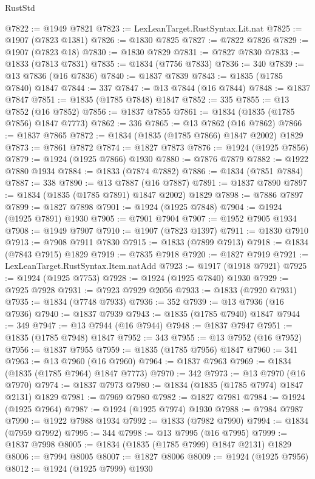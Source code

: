 \begin{lexlean}{RustStd}
\begin{coremodule}
@7822 := @1949 @7821
@7823 := LexLeanTarget.RustSyntax.Lit.nat
@7825 := @1907 (@7823 @1381)
@7826 := @1830 @7825
@7827 := @7822 @7826
@7829 := @1907 (@7823 @18)
@7830 := @1830 @7829
@7831 := @7827 @7830
@7833 := @1833 (@7813 @7831)
@7835 := @1834 (@7756 @7833)
@7836 := 340
@7839 := @13 @7836 (@16 @7836)
@7840 := @1837 @7839
@7843 := @1835 (@1785 @7840) @1847
@7844 := 337
@7847 := @13 @7844 (@16 @7844)
@7848 := @1837 @7847
@7851 := @1835 (@1785 @7848) @1847
@7852 := 335
@7855 := @13 @7852 (@16 @7852)
@7856 := @1837 @7855
@7861 := @1834 (@1835 (@1785 @7856) @1847 @7773)
@7862 := 336
@7865 := @13 @7862 (@16 @7862)
@7866 := @1837 @7865
@7872 := @1834 (@1835 (@1785 @7866) @1847 @2002) @1829
@7873 := @7861 @7872
@7874 := @1827 @7873
@7876 := @1924 (@1925 @7856)
@7879 := @1924 (@1925 @7866) @1930
@7880 := @7876 @7879
@7882 := @1922 @7880 @1934
@7884 := @1833 (@7874 @7882)
@7886 := @1834 (@7851 @7884)
@7887 := 338
@7890 := @13 @7887 (@16 @7887)
@7891 := @1837 @7890
@7897 := @1834 (@1835 (@1785 @7891) @1847 @2002) @1829
@7898 := @7886 @7897
@7899 := @1827 @7898
@7901 := @1924 (@1925 @7848)
@7904 := @1924 (@1925 @7891) @1930
@7905 := @7901 @7904
@7907 := @1952 @7905 @1934
@7908 := @1949 @7907
@7910 := @1907 (@7823 @1397)
@7911 := @1830 @7910
@7913 := @7908 @7911 @7830
@7915 := @1833 (@7899 @7913)
@7918 := @1834 (@7843 @7915) @1829
@7919 := @7835 @7918
@7920 := @1827 @7919
@7921 := LexLeanTarget.RustSyntax.Item.natAdd
@7923 := @1917 (@1918 @7921)
@7925 := @1924 (@1925 @7753)
@7928 := @1924 (@1925 @7840) @1930
@7929 := @7925 @7928
@7931 := @7923 @7929 @2056
@7933 := @1833 (@7920 @7931)
@7935 := @1834 (@7748 @7933)
@7936 := 352
@7939 := @13 @7936 (@16 @7936)
@7940 := @1837 @7939
@7943 := @1835 (@1785 @7940) @1847
@7944 := 349
@7947 := @13 @7944 (@16 @7944)
@7948 := @1837 @7947
@7951 := @1835 (@1785 @7948) @1847
@7952 := 343
@7955 := @13 @7952 (@16 @7952)
@7956 := @1837 @7955
@7959 := @1835 (@1785 @7956) @1847
@7960 := 341
@7963 := @13 @7960 (@16 @7960)
@7964 := @1837 @7963
@7969 := @1834 (@1835 (@1785 @7964) @1847 @7773)
@7970 := 342
@7973 := @13 @7970 (@16 @7970)
@7974 := @1837 @7973
@7980 := @1834 (@1835 (@1785 @7974) @1847 @2131) @1829
@7981 := @7969 @7980
@7982 := @1827 @7981
@7984 := @1924 (@1925 @7964)
@7987 := @1924 (@1925 @7974) @1930
@7988 := @7984 @7987
@7990 := @1922 @7988 @1934
@7992 := @1833 (@7982 @7990)
@7994 := @1834 (@7959 @7992)
@7995 := 344
@7998 := @13 @7995 (@16 @7995)
@7999 := @1837 @7998
@8005 := @1834 (@1835 (@1785 @7999) @1847 @2131) @1829
@8006 := @7994 @8005
@8007 := @1827 @8006
@8009 := @1924 (@1925 @7956)
@8012 := @1924 (@1925 @7999) @1930

\end{coremodule}
\end{lexlean}
